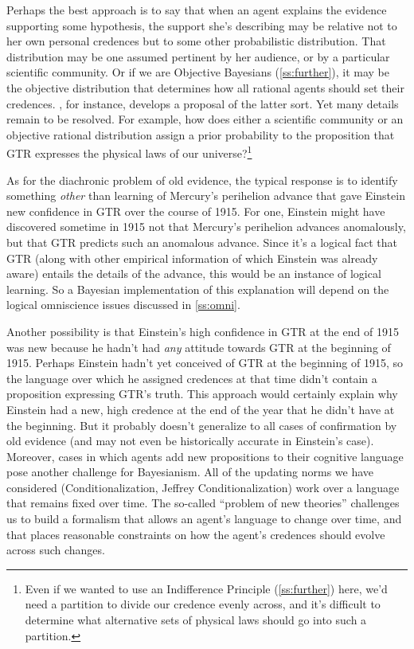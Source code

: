 Perhaps the best approach is to say that when an agent explains the evidence supporting some hypothesis, the support she's describing may be relative not to her own personal credences but to some other probabilistic distribution. That distribution may be one assumed pertinent by her audience, or by a particular scientific community. Or if we are Objective Bayesians (\autoref{ss:further}), it may be the objective distribution that determines how all rational agents should set their credences. \citet{MaherSubjectiveObjective}, for instance, develops a proposal of the latter sort. Yet many details remain to be resolved. For example, how does either a scientific community or an objective rational distribution assign a prior probability to the proposition that GTR expresses the physical laws of our universe?\footnote
{Even if we wanted to use an Indifference Principle (\autoref{ss:further}) here, we'd need a partition to divide our credence evenly across, and it's difficult to determine what alternative sets of physical laws should go into such a partition.} 

As for the diachronic problem of old evidence, the typical response is to identify something \emph{other} than learning of Mercury's perihelion advance that gave Einstein new confidence in GTR over the course of 1915. For one, Einstein might have discovered sometime in 1915 not that Mercury's perihelion advances anomalously, but that GTR predicts such an anomalous advance. Since it's a logical fact that GTR (along with other empirical information of which Einstein was already aware) entails the details of the advance, this would be an instance of logical learning. So a Bayesian implementation of this explanation will depend on the logical omniscience issues discussed in \autoref{ss:omni}.  

Another possibility is that Einstein's high confidence in GTR at the end of 1915 was new because he hadn't had \emph{any} attitude towards GTR at the beginning of 1915. Perhaps Einstein hadn't yet conceived of GTR at the beginning of 1915, so the language over which he assigned credences at that time didn't contain a proposition expressing GTR's truth. This approach would certainly explain why Einstein had a new, high credence at the end of the year that he didn't have at the beginning. But it probably doesn't generalize to all cases of confirmation by old evidence (and may not even be historically accurate in Einstein's case). Moreover, cases in which agents add new propositions to their cognitive language pose another challenge for Bayesianism. All of the updating norms we have considered (Conditionalization, Jeffrey Conditionalization) work over a language that remains fixed over time. The so-called ``problem of new theories'' challenges us to build a formalism that allows an agent's language to change over time, and that places reasonable constraints on how the agent's credences should evolve across such changes.

